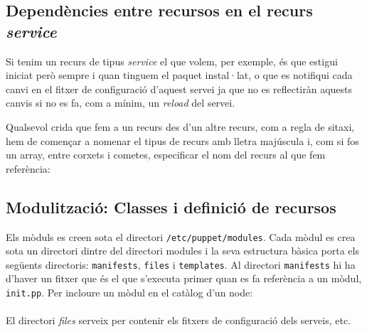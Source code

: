 \documentclass[a4paper]{article}
\begin{document}
\subsection{Dependències entre recursos en el recurs \textit{service}}
Si tenim un recurs de tipus \textit{service} el que volem, per exemple, \'es que estigui iniciat però sempre i quan tinguem el paquet instal·lat, o que es notifiqui cada canvi en el fitxer de configuració d'aquest servei ja que no es reflectiràn aquests canvis si no es fa, com a mínim, un \textit{reload} del servei.

Qualsevol crida que fem a un recurs des d'un altre recurs, com a regla de sitaxi, hem de començar a nomenar el tipus de recurs amb lletra majúscula i, com si fos un array, entre corxets i cometes, especificar el nom del recurs al que fem referència:

\subsection{Modulització: Classes i definició de recursos}
Els mòduls es creen sota el directori \verb+/etc/puppet/modules+. Cada mòdul es crea sota un directori dintre del directori modules i la seva estructura bàsica porta els següents directoris: \verb+manifests+, \verb+files+ i \verb+templates+. Al directori \verb+manifests+ hi ha d'haver un fitxer que \'es el que s'executa primer quan es fa referència a un mòdul, \verb+init.pp+. Per incloure un mòdul en el catàlog d'un node:\\

\\
El directori \textit{files} serveix per contenir els fitxers de configuració dels serveis, etc.
\end{document}
